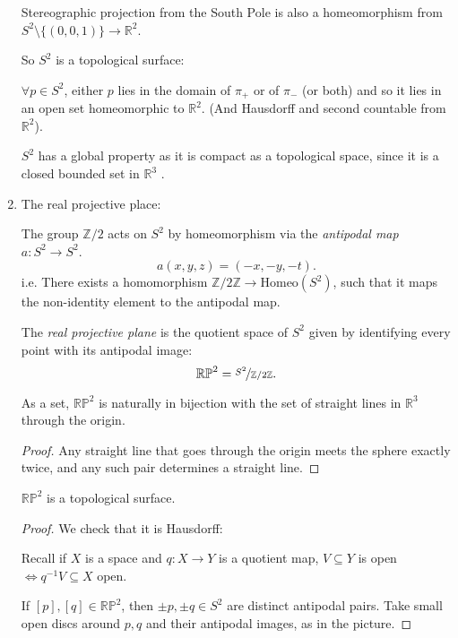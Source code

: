 \begin{example}
\begin{enumerate}
\begin{note}
            Stereographic projection from the South Pole is also a homeomorphism from \(S^2 \setminus \{(0,0,1)\} \to \mathbb{R}^2\). 
        \end{note}
        So \(S^2\) is a topological surface:

        \(\forall p \in S^2\), either \(p\) lies in the domain of \(\pi_+\) or of \(\pi_-\) (or both) and so it lies in an open set homeomorphic to \(\mathbb{R}^2\). (And Hausdorff and second countable from \(\mathbb{R}^2\)).
        \begin{remark}
            \(S^2\) has a global property as it is compact as a topological space, since it is a closed bounded set in \(\mathbb{R}^3\) .
        \end{remark}
        \item The real projective place:
        
        The group \(\mathbb{Z} / 2\) acts on \(S^2\) by homeomorphism via the \textit{antipodal map} \(a: S^2 \to S^2\).
        \[
            a(x,y,z) = (-x,-y,-t).
        \]
        i.e. There exists a homomorphism \(\mathbb{Z} / 2\mathbb{Z} \to  \mathrm{Homeo} (S^2)\), such that it maps the non-identity element to the antipodal map.

        \begin{definition}
            The \textit{real projective plane} is the quotient space of \(S^2\) given by identifying every point with its antipodal image:
            \[
                \mathbb{RP}^2 = \nicefrac{S^2}{\mathbb{Z}/ 2\mathbb{Z}}.
            \]
        \end{definition}

        \begin{lemma}
            As a set, \(\mathbb{RP}^2\) is naturally in bijection with the set of straight lines in \(\mathbb{R}^3\) through the origin.
        \end{lemma}
        \begin{proof}
             Any straight line that goes through the origin meets the sphere exactly twice, and any such pair determines a straight line.
        \end{proof}
        \begin{lemma}
            \(\mathbb{RP}^2\) is a topological surface.
        \end{lemma}
        \begin{proof}
            We check that it is Hausdorff:

            Recall if \(X\) is a space and \(q: X \to Y\) is a quotient map, \(V \subseteq Y\) is open \(\iff q^{-1}V \subseteq X\) open. 

            If \([p],[q] \in \mathbb{RP}^2\), then \(\pm p, \pm q \in S^2\) are distinct antipodal pairs. Take small open discs around \(p,q\) and their antipodal images, as in the picture.
        \end{proof}
    \end{enumerate}
\end{example}